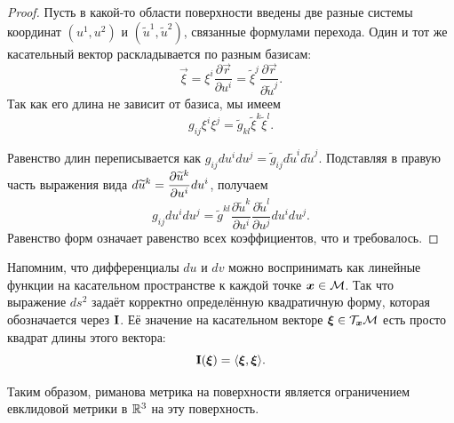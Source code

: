 \begin{proof}
	Пусть в какой-то области поверхности введены две разные системы координат $(u^1, u^2)$ и $(\widetilde{u}^1, \widetilde{u}^2)$, связанные формулами перехода. Один и тот же касательный вектор раскладывается по разным базисам:
	\[
		\vec{\xi} = \xi^i\frac{\partial\vec{r}}{\partial u^i} = \widetilde{\xi}^j\frac{\partial\vec{r}}{\partial\widetilde{u}^j}.
	\]
	Так как его длина не зависит от базиса, мы имеем
	\[
		g_{ij}\xi^i\xi^j = \widetilde{g}_{kl}\widetilde{\xi}^k\widetilde{\xi}^l.
	\]

	Равенство длин переписывается как $g_{ij}du^idu^j = \widetilde{g}_{ij}d\widetilde{u}^id\widetilde{u}^j$. Подставляя в правую часть выражения вида $\displaystyle d\widetilde{u}^k = \frac{\partial\widetilde{u}^k}{\partial u^i}du^i$, получаем
	\[
		g_{ij}du^idu^j = \widetilde{g}^{kl}\frac{\partial\widetilde{u}^k}{\partial u^i}\frac{\partial\widetilde{u}^l}{\partial u^j}du^idu^j.
	\]
	Равенство форм означает равенство всех коэффициентов, что и требовалось.
\end{proof}

Напомним, что дифференциалы $du$ и $dv$ можно воспринимать как линейные функции на касательном пространстве к каждой точке $\boldsymbol{x} \in \mathcal{M}$. Так что выражение $ds^2$ задаёт корректно определённую квадратичную форму, которая обозначается через $\boldsymbol{\operatorname{I}}$. Её значение на касательном векторе $\boldsymbol{\xi} \in \mathcal{T}_{\boldsymbol{x}}\mathcal{M}$ есть просто квадрат длины этого вектора:
\[
	\boldsymbol{\operatorname{I}}(\boldsymbol{\xi}) = \langle\boldsymbol{\xi}, \boldsymbol{\xi}\rangle.
\]

Таким образом, риманова метрика на поверхности является ограничением евклидовой метрики в $\mathbb{R}^3$ на эту поверхность.

\pagebreak


